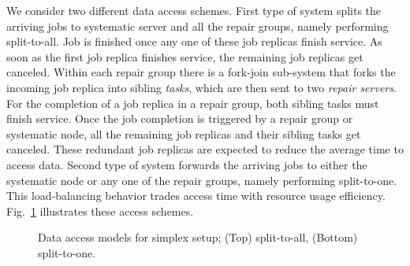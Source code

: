 \documentclass[sigconf,draft]{acmart}
\begin{document}
We consider two different data access schemes. First type of system splits the arriving jobs to systematic server and all the repair groups, namely performing split-to-all. Job is finished once any one of these job replicas finish service. As soon as the first job replica finishes service, the remaining job replicas get canceled. Within each repair group there is a fork-join sub-system that forks the incoming job replica into sibling \emph{tasks}, which are then sent to two \emph{repair servers}. For the completion of a job replica in a repair group, both sibling tasks must finish service. Once the job completion is triggered by a repair group or systematic node, all the remaining job replicas and their sibling tasks get canceled. These redundant job replicas are expected to reduce the average time to access data. Second type of system forwards the arriving jobs to either the systematic node or any one of the repair groups, namely performing split-to-one. This load-balancing behavior trades access time with resource usage efficiency. Fig.~\ref{fig:fig_access_schemes} illustrates these access schemes.
\begin{figure}[hbt]
  \centering
  \vspace*{-0.15cm}
  \caption{Data access models for simplex setup; (Top) split-to-all, (Bottom) split-to-one.}
  \label{fig:fig_access_schemes}
\end{figure}
\end{document}
